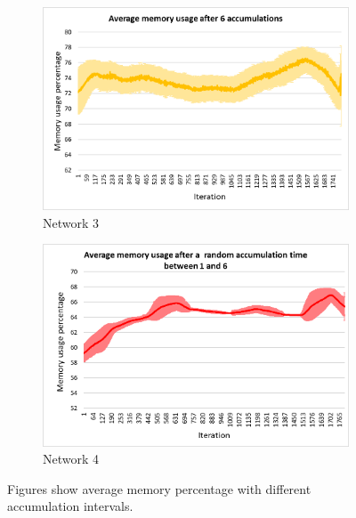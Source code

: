 \documentclass[USenglish]{uit-thesis}
\begin{document}
\begin{figure}
\begin{subfigure}[b]{0.475\textwidth}
            \includegraphics[width=\textwidth]{Mem_stdev_6.png}
            \caption[]%
            {{\small Network 3}}    
            \label{fig:memfig3}
        \end{subfigure}
        \quad
        \begin{subfigure}[b]{0.475\textwidth}   
            \centering 
            \includegraphics[width=\textwidth]{Mem_stdev_rand.png}
            \caption[]%
            {{\small Network 4}}    
            \label{fig:memfig4}
        \end{subfigure}
        \caption[ Figures show average memory percentage with different accumulation intervals.]
        {\small Figures show average memory percentage with different accumulation intervals.} 
        \label{fig:memChart}
    \end{figure}


\newpage
\end{document}
